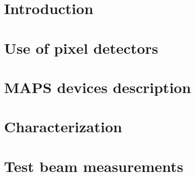 \documentclass[a4paper,11pt]{report}
\begin{document}
\linenumbers


\tableofcontents

\chapter*{Introduction}


\chapter{Use of pixel detectors}\label{chap:usage_of_pixels}


%

\chapter{MAPS devices description}\label{chap:Monopix_Arcadia}



\chapter{Characterization}


\chapter{Test beam measurements}


\printbibliography[heading=bibintoc, title={Bibliography}] 
\end{document}
